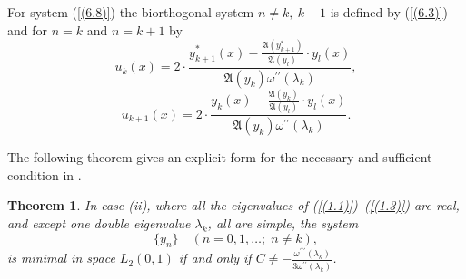 \documentclass[pdflatex,sn-mathphys-num]{sn-jnl}%
\theoremstyle{thmstyleone}%
\theoremstyle{thmstyletwo}%
\theoremstyle{thmstylethree}%
\newtheorem{thm}{Theorem}[section]
\theoremstyle{definition}
\theoremstyle{remark}
\numberwithin{equation}{section}
\begin{document}
For system (\ref{(6.8)}) the biorthogonal system  $n \ne k,\ k+1$ is defined by (\ref{(6.3)}) and for 
$n = k$ and $n = k+1$ by
\begin{equation}
u_k(x)=2\cdot\frac{y^*_{k+1}(x)-\frac{\mathfrak{A}(y^*_{k+1})}{\mathfrak{A}(y_l)}\cdot y_l(x)}{ \mathfrak{A}(y_k)\omega^{\prime\prime}(\lambda_k)}
, \label{(6.13)}
\end{equation}
\begin{equation}
u_{k+1}(x)=2\cdot\frac{y_k(x)-\frac{\mathfrak{A}(y_{k})}{\mathfrak{A}(y_l)}\cdot y_l(x)}{ \mathfrak{A}(y_{k})\omega^{\prime\prime}(\lambda_k)}
. \label{(6.14)}
\end{equation}


The following theorem gives an explicit form for the necessary and sufficient condition in \cite{aliyev5}.
\begin{thm} 
In case (ii), where  all the eigenvalues of (\ref{(1.1)})--(\ref{(1.3)}) are real, and except one double eigenvalue $\lambda_k$, all are simple, the system
\begin{equation}
  \{ y_n \} \quad (n = 0,1,\ldots;\; n \neq k), \label{(6.9)} 
\end{equation}
is minimal in space $L_2(0,1)$ if and only if $C\neq-\frac{\omega^{\prime\prime\prime}(\lambda_k)}{3\omega^{\prime\prime}(\lambda_k)}$.
\end{thm}
\end{document}
